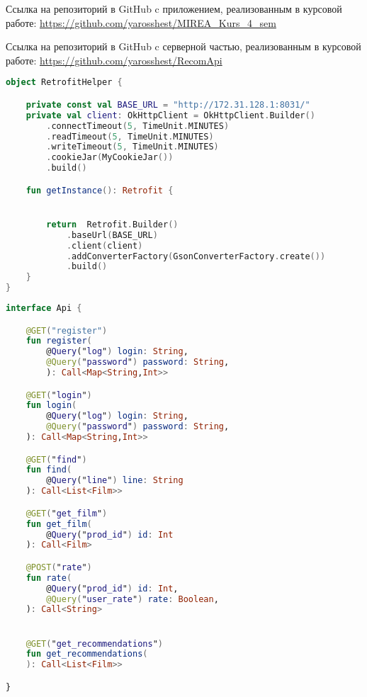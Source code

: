 Ссылка на репозиторий в GitHub c приложением, реализованным в курсовой работе:
\url{https://github.com/yarosshest/MIREA_Kurs_4_sem}

Ссылка на репозиторий в GitHub c серверной частью, реализованным в курсовой работе:
\url{https://github.com/yarosshest/RecomApi}


\begin{lstlisting}[language=Kotlin, caption=\leftline{RetrofitHelper}, label=lst:RetrofitHelper]
object RetrofitHelper {

    private const val BASE_URL = "http://172.31.128.1:8031/"
    private val client: OkHttpClient = OkHttpClient.Builder()
        .connectTimeout(5, TimeUnit.MINUTES)
        .readTimeout(5, TimeUnit.MINUTES)
        .writeTimeout(5, TimeUnit.MINUTES)
        .cookieJar(MyCookieJar())
        .build()

    fun getInstance(): Retrofit {


        return  Retrofit.Builder()
            .baseUrl(BASE_URL)
            .client(client)
            .addConverterFactory(GsonConverterFactory.create())
            .build()
    }
}
\end{lstlisting}

\begin{lstlisting}[language=Kotlin, caption=\leftline{Api}, label=lst:Api]
interface Api {

    @GET("register")
    fun register(
        @Query("log") login: String,
        @Query("password") password: String,
        ): Call<Map<String,Int>>

    @GET("login")
    fun login(
        @Query("log") login: String,
        @Query("password") password: String,
    ): Call<Map<String,Int>>

    @GET("find")
    fun find(
        @Query("line") line: String
    ): Call<List<Film>>

    @GET("get_film")
    fun get_film(
        @Query("prod_id") id: Int
    ): Call<Film>

    @POST("rate")
    fun rate(
        @Query("prod_id") id: Int,
        @Query("user_rate") rate: Boolean,
    ): Call<String>


    @GET("get_recommendations")
    fun get_recommendations(
    ): Call<List<Film>>

}
\end{lstlisting}

